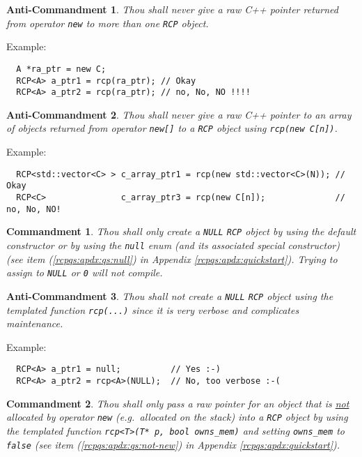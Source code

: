 \documentclass[pdf,ps2pdf,11pt]{SANDreport}
\newtheorem{commandment}{Commandment}
\newtheorem{anticommandment}{Anti-Commandment}
\begin{document}
\begin{anticommandment}
Thou shall never give a raw C++ pointer returned from operator
{}\texttt{new} to more than one {}\texttt{RCP} object.
\end{anticommandment}

{}\noindent{}Example:
{\small\begin{verbatim}
  A *ra_ptr = new C;
  RCP<A> a_ptr1 = rcp(ra_ptr); // Okay
  RCP<A> a_ptr2 = rcp(ra_ptr); // no, No, NO !!!!
\end{verbatim}}

\begin{anticommandment}
Thou shall never give a raw C++ pointer to an array of objects
returned from operator {}\texttt{new[]} to a
{}\texttt{RCP} object using {}\texttt{rcp(new C[n])}.
\end{anticommandment}

{}\noindent{}Example:
{\small\begin{verbatim}
  RCP<std::vector<C> > c_array_ptr1 = rcp(new std::vector<C>(N)); // Okay
  RCP<C>               c_array_ptr3 = rcp(new C[n]);              // no, No, NO!
\end{verbatim}}

\begin{commandment}
Thou shall only create a {}\texttt{NULL} {}\texttt{RCP}
object by using the default constructor or by using the
{}\texttt{null} enum (and its associated special constructor) (see
item ({}\ref{rcpqs:apdx:qs:null}) in Appendix
{}\ref{rcpqs:apdx:quickstart}).  Trying to assign to {}\texttt{NULL}
or {}\texttt{0} will not compile.
\end{commandment}

\begin{anticommandment}
Thou shall not create a {}\texttt{NULL} {}\texttt{RCP}
object using the templated function {}\texttt{rcp(...)} since it is
very verbose and complicates maintenance.
\end{anticommandment}

{}\noindent{}Example:
{\small\begin{verbatim}
  RCP<A> a_ptr1 = null;          // Yes :-)
  RCP<A> a_ptr2 = rcp<A>(NULL);  // No, too verbose :-(
\end{verbatim}}

\begin{commandment}
Thou shall only pass a raw pointer for an object that is
{}\underline{not} allocated by operator {}\texttt{new} (e.g.~allocated
on the stack) into a {}\texttt{RCP} object by using the
templated function {}\texttt{rcp<T>(T* p, bool owns\_mem)} and setting
{}\texttt{owns\_mem} to {}\texttt{false} (see item
({}\ref{rcpqs:apdx:qs:not-new}) in Appendix
{}\ref{rcpqs:apdx:quickstart}).
\end{commandment}
\end{document}
